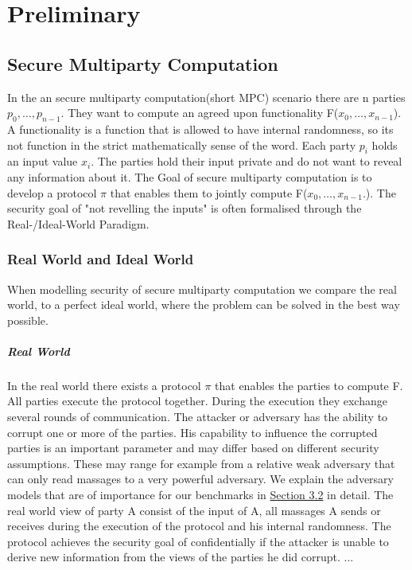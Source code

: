 \chapter{Preliminary}
\section{Secure Multiparty Computation}
In the an secure multiparty computation(short MPC) scenario there are n parties $ p_0,\dots,p_{n-1} $. They want to compute an agreed upon functionality F($ x_0,\dots,x_{n-1} $). A functionality is a function that is allowed to have internal randomness, so its not function in the strict mathematically sense of the word. 
Each party $ p_i $ holds an input value $ x_i $. 
The parties hold their input private and do not want to reveal any information about it. The Goal of secure multiparty computation is to develop a protocol  $ \pi $ that enables them to jointly compute F($ x_0,\dots,x_{n-1}. $). The security goal of "not revelling the inputs" is often formalised through the Real-/Ideal-World Paradigm. 


\subsection{Real World and Ideal World}
When modelling security of secure multiparty computation we compare the real world, to a perfect ideal world, where the problem can be solved in the best way possible.
\paragraph{Real World}
In the real world there exists a protocol $\pi $ that enables the parties to compute F. All parties execute the protocol together. During the execution they exchange several rounds of communication. The attacker or adversary has the ability to corrupt one or more of the parties. His capability to influence the corrupted parties is an important parameter and may differ based on different security assumptions. These may range for example from a relative weak adversary that can only read massages to a very powerful adversary. We explain the adversary models that are of importance for our benchmarks in \hyperref[sec:Adversarial Models]{Section 3.2} in detail.
The real world view of party A consist of the input of A, all massages A sends or receives during the execution of the protocol and his internal randomness. The protocol achieves the security goal of confidentially if the attacker is unable to derive new information from the views of the parties he did corrupt. ...
